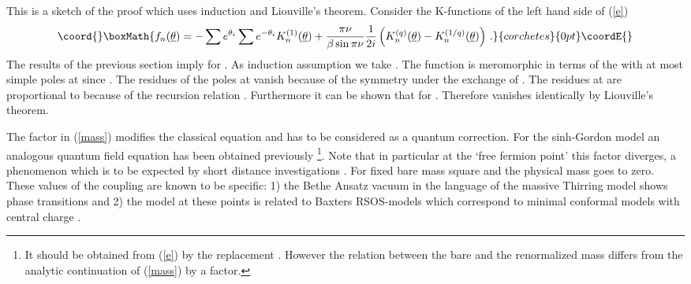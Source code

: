 \documentclass[a4paper,12pt]{article}
\begin{document}
This is a sketch of the proof \cite{BK2} which uses induction and Liouville's
theorem. Consider the K-functions of the left hand side of (\ref{e}) 
\[\coord{}\boxMath{
f_{n}(\underline{\theta })=-\sum e^{\theta _{i}}\sum e^{-\theta
_{i}}K_{n}^{(1)}(\underline{\theta })+\frac{\pi \nu }{\beta \sin \pi \nu }%
\frac{1}{2i}\left( K_{n}^{(q)}(\underline{\theta })-K_{n}^{(1/q)}(\underline{%
\theta })\right) \,. 
}{corchetes}{0pt}\coordE{}\]
The results of the previous section imply \coordHE{} for \coordHE{}. As induction assumption we take \coordHE{}. The function \coordHE{} is meromorphic in terms of the \coordHE{} with at
most simple poles at \coordHE{} since \coordHE{}. The residues of the poles
at \coordHE{} vanish because of the symmetry under the exchange of \coordHE{}. The residues at \coordHE{} are proportional
to \coordHE{} because of the recursion
relation \coordHE{}. Furthermore it can be shown \cite{BK2} that \coordHE{} for \coordHE{}. Therefore 
\coordHE{} vanishes identically by Liouville's theorem.

The factor \myHighlight{$\frac{\pi \nu }{\sin \pi \nu }$}\coordHE{} in (\ref{mass}) modifies the
classical equation and has to be considered as a quantum correction. For the
sinh-Gordon model an analogous quantum field equation has been obtained
previously \cite{MS}\footnote{%
It should be obtained from (\ref{e}) by the replacement \coordHE{}. However the relation between the bare and the renormalized mass
differs from the analytic continuation of (\ref{mass}) by a factor.}. Note
that in particular at the `free fermion point' \coordHE{} this factor diverges, a phenomenon which is to be
expected by short distance investigations \cite{ST}. For fixed bare mass
square \myHighlight{$\alpha $}\coordHE{} and \coordHE{} the physical mass goes
to zero. These values of the coupling are known to be specific: 1) the Bethe
Ansatz vacuum in the language of the massive Thirring model shows phase
transitions \cite{Ko} and 2) the model at these points is related \cite
{K3,LeC,Sm1} to Baxters RSOS-models which correspond to minimal conformal
models with central charge \coordHE{}.
\end{document}
